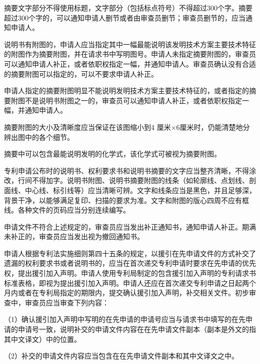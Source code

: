 摘要文字部分不得使用标题，文字部分（包括标点符号）不得超过300个字。摘要超过300个字的，可以通知申请人删节或者由审查员删节；审查员删节的，应当通知申请人。

说明书有附图的，申请人应当指定其中一幅最能说明该发明技术方案主要技术特征的附图作为摘要附图，并在请求书中写明图号。申请人未指定摘要附图的，审查员可以通知申请人补正，或者依职权指定一幅，并通知申请人。审查员确认没有合适的摘要附图可以指定的，可以不要求申请人补正。

申请人指定的摘要附图明显不能说明发明技术方案主要技术特征的，或者指定的摘要附图不是说明书附图之一的，审查员可以通知申请人补正，或者依职权指定一幅，并通知申请人。

{\setlength{\parindent}{22.7bp}摘要附图的大小及清晰度应当保证在该图缩小到4 厘米×6厘米时，仍能清楚地分辨出图中的各个细节。\par}

摘要中可以包含最能说明发明的化学式，该化学式可被视为摘要附图。

专利申请公布时的说明书、权利要求书和说明书摘要的文字应当整齐清晰，不得涂改，行间不得加字。说明书附图、说明书摘要附图的线条（如轮廓线、点划线、剖面线、中心线、标引线等）应当清晰可辨。文字和线条应当是黑色，并且足够深，背景干净，以能够满足复印、扫描的要求为准。文字和附图的版心四周不应有框线。各种文件的页码应当分别连续编写。

申请文件不符合上述规定的，审查员应当发出补正通知书，通知申请人补正。期满未补正的，审查员应当发出视为撤回通知书。

申请人根据专利法实施细则第四十五条的规定，以援引在先申请文件的方式补交了遗漏的权利要求书或者说明书的，应当在首次递交专利申请时要求在先申请的优先权，提出援引加入声明。申请人使用专利局制定的包含援引加入声明的专利请求书标准表格，即视为提出援引加入声明。申请人还应在首次递交专利申请之日起两个月内或者在专利局指定的期限内，提交确认援引加入声明，补交相关文件。初步审查中，审查员应当审查下列内容：

（1）确认援引加入声明中写明的在先申请的申请号应当与请求书中填写的在先申请的申请号一致，说明补交的申请文件内容在在先申请文件副本（副本是外文的指其中文译文）中的位置。

（2）补交的申请文件内容应当包含在在先申请文件副本和其中文译文之中。

